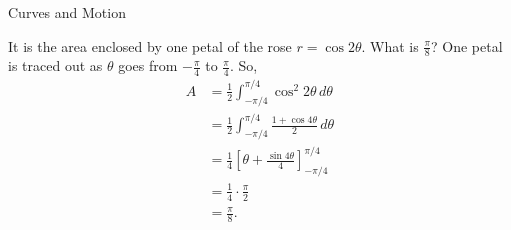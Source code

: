 \documentclass{article}
\begin{document}
\begin{category}{Curves and Motion}
  \begin{clue}[say]
    It is the area enclosed by one petal of the rose $r=\cos 2\theta$.
  \response
    What is $\frac{\pi}{8}$?
  \solution
    One petal is traced out as $\theta$ goes from $-\frac{\pi}{4}$ to $\frac{\pi}{4}$. So,
    \begin{align*}
    A
    &=\frac{1}{2}\int_{-\pi/4}^{\pi/4}\cos^2 2\theta\,d\theta \\
    &=\frac{1}{2}\int_{-\pi/4}^{\pi/4}\frac{1+\cos 4\theta}{2}\,d\theta \\
    &=\frac{1}{4}\left[\theta+\frac{\sin 4\theta}{4}\right]_{-\pi/4}^{\pi/4} \\
    &=\frac{1}{4}\cdot\frac{\pi}{2} \\
    &=\frac{\pi}{8}.
    \end{align*}
  \end{clue}

\end{category}
\end{document}
